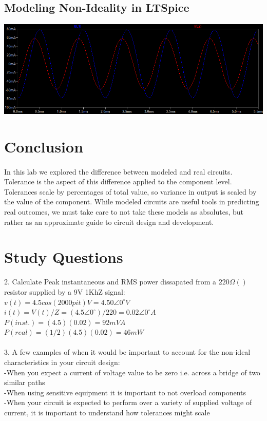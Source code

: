 \documentclass{article}
\begin{document}
\subsection*{Modeling Non-Ideality in LTSpice}
\includegraphics[width=\textwidth]{graph}


\section*{Conclusion}
\paragraph{}
In this lab we explored the difference between modeled and real circuits. Tolerance is the aspect of this difference applied to the component level. Tolerances scale by percentages of total value, so variance in output is scaled by the value of the component. While modeled circuits are useful tools in predicting real outcomes, we must take care to not take these models as absolutes, but rather as an approximate guide to circuit design and development. 

\section*{Study Questions}
2. Calculate Peak instantaneous and RMS power dissapated from a $220\Omega()$ resistor supplied by a 9V 1KhZ signal:
\\
$v(t) = 4.5cos(2000pi t) V = 4.50\angle{}0^\circ{} V$
\\
$i(t) = V(t)/Z = (4.5\angle{}0^\circ{})/220 = 0.02\angle{}0^\circ{} A$
\\
$P(inst.) = (4.5)(0.02) = 92mVA$
\\
$P(real) = (1/2)(4.5)(0.02) = 46mW$
\\
\\
3. A few examples of when it would be important to account for the non-ideal characteristics in your circuit design: 
\\
-When you expect a current of voltage value to be zero i.e. across a bridge of two similar paths
\\
-When using sensitive equipment it is important to not overload components
\\
-When your circuit is expected to perform over a variety of supplied voltage of current, it is important to understand how tolerances might scale


\end{document}
